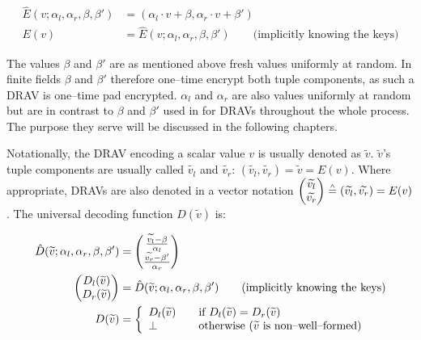 \begin{align}
  \label{eqn:one-time-pad}
  \hat{E}(v; \alpha_l, \alpha_r, \beta, \beta') &=
  (\alpha_l \cdot v + \beta, \alpha_r \cdot v + \beta')\\
  E(v) &= \hat{E}(v; \alpha_l, \alpha_r, \beta, \beta') \qquad
  \text{(implicitly knowing the keys)}\nonumber
\end{align}

\noindent{}The values $\beta$ and $\beta'$ are as mentioned above fresh values
uniformly at random. In finite fields $\beta$ and $\beta'$ therefore one--time
encrypt both tuple components, as such a DRAV is one--time pad encrypted.
$\alpha_l$ and $\alpha_r$ are also values uniformly at random but are in
contrast to $\beta$ and $\beta'$ used in for DRAVs throughout the whole
process. The purpose they serve will be discussed in the following chapters.

Notationally, the DRAV encoding a scalar value $v$ is usually denoted as
$\widetilde{v}$. $\widetilde{v}$'s tuple components are usually called
$\widetilde{v_l}$ and $\widetilde{v_r}$: $(\widetilde{v_l}, \widetilde{v_r}) =
\widetilde{v} = E(v)$. Where appropriate, DRAVs are also denoted in a vector
notation $\begin{pmatrix}\widetilde{v_l}\\\widetilde{v_r}\end{pmatrix}
\stackrel{\scriptscriptstyle\wedge}{=} (\widetilde{v_l}, \widetilde{v_r}) = E(v)$. The universal decoding
function $D(\widetilde{v})$ is:

\begin{align}
  \hat{D}(\widetilde{v}; \alpha_l, \alpha_r, \beta, \beta') &=
  \begin{pmatrix}
    \frac{\widetilde{v_l} - \beta}{\alpha_l}\\
    \frac{\widetilde{v_r} - \beta'}{\alpha_r}
  \end{pmatrix} \nonumber\\
  \label{eqn:keys-assumed}
\begin{pmatrix}D_l(\widetilde{v})\\D_r(\widetilde{v})\end{pmatrix} &=
  \hat{D}(\widetilde{v}; \alpha_l, \alpha_r, \beta, \beta') \qquad
  \text{(implicitly knowing the keys)}\\
  D(\widetilde{v}) &=
  \left\{
    \begin{array}{l l}
      D_l(\widetilde{v}) & \quad
      \text{if}~D_l(\widetilde{v}) = D_r(\widetilde{v})\\
      \bot & \quad \text{otherwise ($\widetilde{v}$ is non--well--formed)}\\
    \end{array}\right.\nonumber
\end{align}

